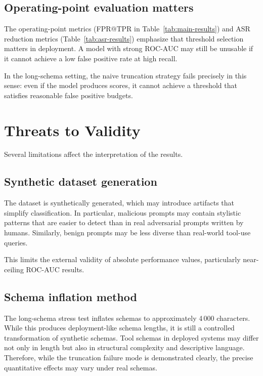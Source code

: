 \subsection{Operating-point evaluation matters}

The operating-point metrics (FPR@TPR in Table~\ref{tab:main-results}) and ASR reduction metrics (Table~\ref{tab:asr-results}) emphasize that threshold selection matters in deployment. A model with strong ROC-AUC may still be unusable if it cannot achieve a low false positive rate at high recall.

In the long-schema setting, the naive truncation strategy fails precisely in this sense: even if the model produces scores, it cannot achieve a threshold that satisfies reasonable false positive budgets.

\section{Threats to Validity}
\label{subsec:discussion_validity}

Several limitations affect the interpretation of the results.

\subsection{Synthetic dataset generation}

The dataset is synthetically generated, which may introduce artifacts that simplify classification. In particular, malicious prompts may contain stylistic patterns that are easier to detect than in real adversarial prompts written by humans. Similarly, benign prompts may be less diverse than real-world tool-use queries.

This limits the external validity of absolute performance values, particularly near-ceiling ROC-AUC results.

\subsection{Schema inflation method}

The long-schema stress test inflates schemas to approximately 4\,000 characters. While this produces deployment-like schema lengths, it is still a controlled transformation of synthetic schemas. Tool schemas in deployed systems may differ not only in length but also in structural complexity and descriptive language. Therefore, while the truncation failure mode is demonstrated clearly, the precise quantitative effects may vary under real schemas.

